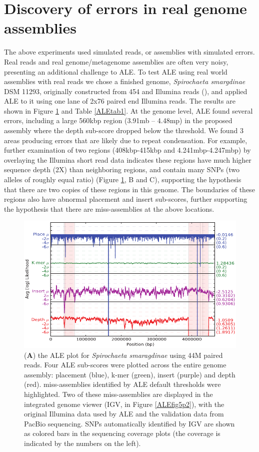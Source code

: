 \documentclass[phd,tocprelim]{cornell}
\begin{document}
\section{Discovery of errors in real genome assemblies}
\label{ALE_res_spiro}

The above experiments used simulated reads, or assemblies with simulated errors. Real reads and real genome/metagenome assemblies are often very noisy, presenting an additional challenge to ALE. To test ALE using real world assemblies with real reads we chose a finished genome, {\it Spirochaeta smargdinae} DSM 11293, originally constructed from 454 and Illumina reads (\cite{Mavromatis2010}), and applied ALE to it using one lane of 2x76 paired end Illumina reads. The results are shown in Figure \ref{ALEfig5} and Table \ref{ALEtab1}. At the genome level, ALE found several errors, including a large 560kbp region (3.91mb – 4.48mp) in the proposed assembly where the depth sub-score dropped below the threshold. We found 3 areas producing errors that are likely due to repeat condensation. For example, further examination of two regions (408kbp-415kbp and 4.241mbp-4.247mbp) by overlaying the Illumina short read data indicates these regions have much higher sequence depth (2X) than neighboring regions, and contain many SNPs (two alleles of roughly equal ratio) (Figure \ref{ALEfig5}, B and C), supporting the hypothesis that there are two copies of these regions in this genome. The boundaries of these regions also have abnormal placement and insert sub-scores, further supporting the hypothesis that there are miss-assemblies at the above locations.

\begin{figure}[!tpb]%
    \centerline{\includegraphics[width=\textwidth]{figures/ALE/fig5_top.pdf}}
    \caption[ALE performance on real reads]{({\bf A}) the ALE plot for {\it Spirochaeta smaragdinae} using 44M paired reads. Four ALE sub-scores were plotted across the entire genome assembly: placement (blue), k-mer (green), insert (purple) and depth (red). miss-assemblies identified by ALE default thresholds were highlighted. Two of these miss-assemblies are displayed in the integrated genome viewer (IGV, in Figure \ref{ALEfig5p2}), with the original Illumina data used by ALE and the validation data from PacBio sequencing. SNPs automatically identified by IGV are shown as colored bars in the sequencing coverage plots (the coverage is indicated by the numbers on the left).}\label{ALEfig5}
\end{figure}
\end{document}
